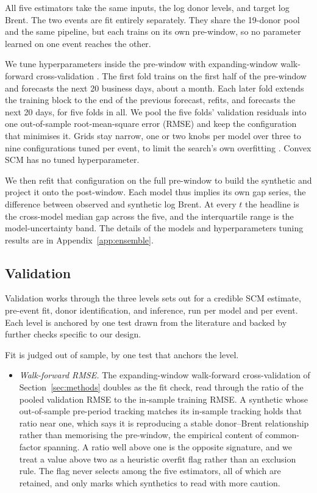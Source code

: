 All five estimators take the same inputs, the log donor levels, and target log Brent. The
two events are fit entirely separately. They share the 19-donor pool and the same
pipeline, but each trains on its own pre-window, so no parameter learned on one event
reaches the other. 

We tune hyperparameters inside the
pre-window with expanding-window walk-forward cross-validation
\citep{bergmeir2012,hyndman2018}. The first fold trains on the first half of the pre-window
and forecasts the next 20 business days, about a month. Each later fold extends the
training block to the end of the previous forecast, refits, and forecasts the next 20 days,
for five folds in all. We pool the five folds' validation residuals into one out-of-sample
root-mean-square error (RMSE) \citep{hyndman2018} and keep the configuration that minimises it. Grids stay narrow, one or two knobs per model over three to nine
configurations tuned per event, to limit the search's own overfitting \citep{cawley2010}.
Convex SCM has no tuned hyperparameter. 

We then refit that configuration on the full pre-window to build the
synthetic and project it onto the post-window. Each model thus implies its own gap series,
the difference between observed and synthetic log Brent. At every $t$ the headline is the
cross-model median gap across the five, and the interquartile range is the
model-uncertainty band. The details of the models and hyperparameters tuning results are in Appendix~\ref{app:ensemble}.

\subsection{Validation}
Validation works through the three levels \citet{abadie2021} sets out for a credible SCM
estimate, pre-event fit, donor identification, and inference, run per model and per event.
Each level is anchored by one test drawn from the literature and backed by further checks
specific to our design.

Fit is judged out of sample, by one test that anchors the level.
\begin{itemize}
\item \textit{Walk-forward RMSE.} The expanding-window walk-forward cross-validation of
Section~\ref{sec:methods} \citep{hyndman2018,bergmeir2012} doubles as the fit check, read
through the ratio of the pooled validation RMSE to the in-sample training RMSE. A synthetic
whose out-of-sample pre-period tracking matches its in-sample tracking holds that ratio near
one, which says it is reproducing a stable donor--Brent relationship rather than memorising
the pre-window, the empirical content of common-factor spanning. A ratio well above one is
the opposite signature, and we treat a value above two as a heuristic overfit flag rather
than an exclusion rule. The flag never selects among the five estimators, all of which are
retained, and only marks which synthetics to read with more caution.
\end{itemize}

